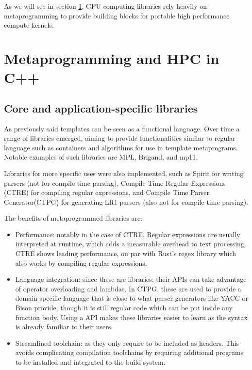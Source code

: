 \documentclass[../main]{subfiles}
\begin{document}
As we will see in section \ref{lbl:meta-cpp}, GPU computing libraries
rely heavily on \cpp metaprogramming to provide building blocks for
portable high performance compute kernels.

\section{
  Metaprogramming and HPC in C++
}
\label{lbl:meta-cpp}

\subsection{Core and application-specific libraries}

As previously said \cpp templates can be seen as a functional language.
Over time a range of libraries emerged, aiming to provide functionalities
similar to regular language such as containers and algorithms for use in
template metaprograms. Notable examples of such libraries are MPL\cite{mpl},
Brigand\cite{brigand}, and mp11\cite{mp11}.

Libraries for more specific uses were also implemented, such as
Spirit\cite{spirit} for writing parsers (not for compile time parsing),
Compile Time Regular Expressions (CTRE)\cite{ctre}
for compiling regular expressions,
and Compile Time Parser Generator(CTPG)\cite{ctpg}
for generating LR1 parsers (also not for compile time parsing).

The benefits of metaprogrammed libraries are:

\begin{itemize}

\item Performance: notably in the case of CTRE.
Regular expressions are usually interpreted at runtime,
which adds a measurable overhead to text processing.
CTRE shows leading performance, on par with Rust's regex library
which also works by compiling regular expressions.

\item Language integration: since these are \cpp libraries,
their APIs can take advantage of \cpp operator overloading and lambdas.
In CTPG, these are used to provide a domain-specific language that is close to
what parser generators like YACC or Bison provide,
though it is still regular \cpp code which can be put inside any function body.
Using a \cpp API makes these libraries easier to learn
as the syntax is already familiar to their users.

\item Streamlined toolchain: as they only require to be included as headers.
This avoids complicating compilation toolchains by requiring additional programs
to be installed and integrated to the build system.

\end{itemize}
\end{document}
